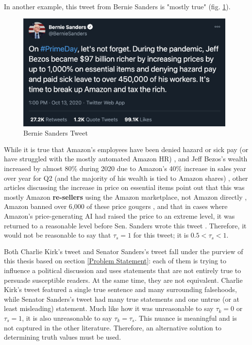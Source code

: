 \documentclass[12pt]{article}
\begin{document}
In another example, this tweet from Bernie Sanders is "mostly true" (fig. \ref{fig:Bernie Sanders Tweet, Oct 13, 2020}). 
 \begin{figure}[h]
    \centering
    \includegraphics[width=11cm]{BernieTweet.png}
    \caption{Bernie Sanders Tweet}
    \label{fig:Bernie Sanders Tweet, Oct 13, 2020}
\end{figure}
While it is true that Amazon's employees have been denied hazard or sick pay (or have struggled with the mostly automated Amazon HR) \cite{cnbc2020amazon,guardian2020amazon}, and Jeff Bezos's wealth increased by almost 80\% during 2020 due to Amazon's 40\% increase in sales year over year for Q2 (and the majority of his wealth is tied to Amazon shares) \cite{Stebbins2020bezos}, other articles discussing the increase in price on essential items point out that this was mostly Amazon \textbf{re-sellers} using the Amazon marketplace, not Amazon directly \cite{nicas2020sanitizer, kim2020price,gibson2020amazon}, Amazon banned over 6,000 of these price gougers \cite{bezos2020letter}, and that in cases where Amazon's price-generating AI had raised the price to an extreme level, it was returned to a reasonable level before Sen. Sanders wrote this tweet \cite{harman2020prime}. Therefore, it would not be reasonable to say that $\tau_s = 1$ for this tweet; it is $ 0.5 < \tau_s < 1$. 

Both Charlie Kirk's tweet and Senator Sanders's tweet fall under the purview of this thesis based on section \ref{Problem Statement}: each of them is trying to influence a political discussion and uses statements that are not entirely true to persuade susceptible readers. At the same time, they are not equivalent. Charlie Kirk's tweet featured a single true sentence and many surrounding falsehoods, while Senator Sanders's tweet had many true statements and one untrue (or at least misleading) statement. Much like how it was unreasonable to say $\tau_k = 0$ or $\tau_s = 1$, it is also unreasonable to say $\tau_k = \tau_s$. This nuance is meaningful and is not captured in the other literature. Therefore, an alternative solution to determining truth values must be used.
\end{document}
